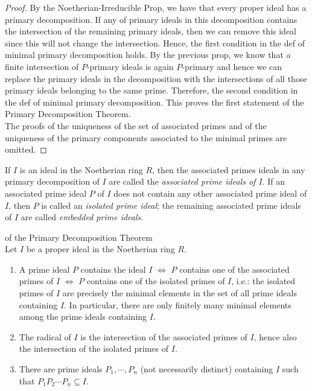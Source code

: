 \begin{proof}
    By the Noetherian-Irreducible Prop, we have that every proper ideal has a primary decomposition. If any of primary ideals in this decomposition contains the intersection of the remaining primary ideals, then we can remove this ideal since this will not change the intersection. Hence, the first condition in the def of minimal primary decomposition holds. By the previous prop, we know that a finite intersection of $P$-primary ideals is again $P$-primary and hence we can replace the primary ideals in the decomposition with the intersections of all those primary ideals belonging to the same prime. Therefore, the second condition in the def of minimal primary decomposition. This proves the first statement of the Primary Decomposition Theorem.\\
    The proofs of the uniqueness of the set of associated primes and of the uniqueness of the primary components associated to the minimal primes are omitted.
\end{proof}

\begin{definition}
    If $I$ is an ideal in the Noetherian ring $R$, then the associated primes ideals in any primary decomposition of $I$ are called the \textit{associated prime ideals of $I$}. If an associated prime ideal $P$ of $I$ does not contain any other associated prime ideal of $I$, then $P$ is called an \textit{isolated prime ideal}; the remaining associated prime ideals of $I$ are called \textit{embedded prime ideals}.
\end{definition}

\begin{corollary}{of the Primary Decomposition Theorem}\\
Let $I$ be a proper ideal in the Noetherian ring $R$.
\begin{enumerate}
    \item A prime ideal $P$ contains the ideal $I$ $\Leftrightarrow$ $P$ contains one of the associated primes of $I$ $\Leftrightarrow$ $P$ contains one of the isolated primes of $I$, i.e.: the isolated primes of $I$ are precisely the minimal elements in the set of all prime ideals containing $I$. In particular, there are only finitely many minimal elements among the prime ideals containing $I$.

    \item The radical of $I$ is the intersection of the associated primes of $I$, hence also the intersection of the isolated primes of $I$.

    \item There are prime ideals $P_1, \cdots, P_n$ (not necessarily distinct) containing $I$ such that $P_1P_2\cdots P_n \subseteq I$.
\end{enumerate}
\end{corollary}


